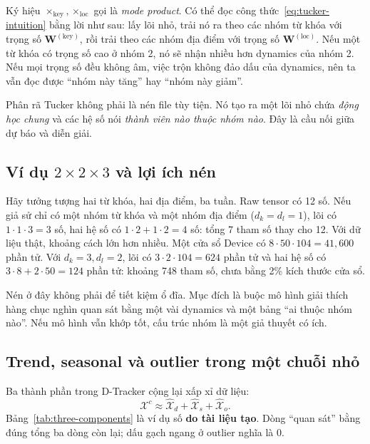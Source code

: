 Ký hiệu $\times_{\mathrm{key}},\times_{\mathrm{loc}}$ gọi là \emph{mode product}. Có thể đọc
công thức~\eqref{eq:tucker-intuition} bằng lời như sau: lấy lõi nhỏ, trải nó ra theo các nhóm
từ khóa với trọng số $\mathbf{W}^{(\mathrm{key})}$, rồi trải theo các nhóm địa điểm với trọng số
$\mathbf{W}^{(\mathrm{loc})}$. Nếu một từ khóa có trọng số cao ở nhóm 2, nó sẽ nhận nhiều hơn
dynamics của nhóm 2. Nếu mọi trọng số đều không âm, việc trộn không đảo dấu của dynamics, nên
ta vẫn đọc được ``nhóm này tăng'' hay ``nhóm này giảm''.

\begin{keypoint}
Phân rã Tucker không phải là nén file tùy tiện. Nó tạo ra một lõi nhỏ chứa \emph{động học chung}
và các hệ số nói \emph{thành viên nào thuộc nhóm nào}. Đây là cầu nối giữa dự báo và diễn giải.
\end{keypoint}

\subsection{Ví dụ \texorpdfstring{$2\times2\times3$}{2x2x3} và lợi ích nén}

Hãy tưởng tượng hai từ khóa, hai địa điểm, ba tuần. Raw tensor có 12 số. Nếu giả sử chỉ có một
nhóm từ khóa và một nhóm địa điểm ($d_k=d_l=1$), lõi có $1\cdot1\cdot3=3$ số, hai hệ số có
$1\cdot2+1\cdot2=4$ số: tổng 7 tham số thay cho 12. Với dữ liệu thật, khoảng cách lớn hơn nhiều.
Một cửa sổ Device có $8\cdot50\cdot104=41{,}600$ phần tử. Với $d_k=3,d_l=2$, lõi có
$3\cdot2\cdot104=624$ phần tử và hai hệ số có $3\cdot8+2\cdot50=124$ phần tử: khoảng 748 tham số,
chưa bằng 2\% kích thước cửa sổ.

\begin{plainwords}
Nén ở đây không phải để tiết kiệm ổ đĩa. Mục đích là buộc mô hình giải thích hàng chục nghìn
quan sát bằng một vài dynamics và một bảng ``ai thuộc nhóm nào''. Nếu mô hình vẫn khớp tốt, cấu
trúc nhóm là một giả thuyết có ích.
\end{plainwords}

\subsection{Trend, seasonal và outlier trong một chuỗi nhỏ}

Ba thành phần trong D-Tracker cộng lại xấp xỉ dữ liệu:
\begin{equation}
  \mathcal{X}^{c}\approx\widehat{\mathcal{X}}_d
  +\widehat{\mathcal{X}}_s+\widehat{\mathcal{X}}_o.
  \label{eq:decompose-primer}
\end{equation}
Bảng~\ref{tab:three-components} là ví dụ số \textbf{do tài liệu tạo}. Dòng ``quan sát'' bằng
đúng tổng ba dòng còn lại; dấu gạch ngang ở outlier nghĩa là 0.

